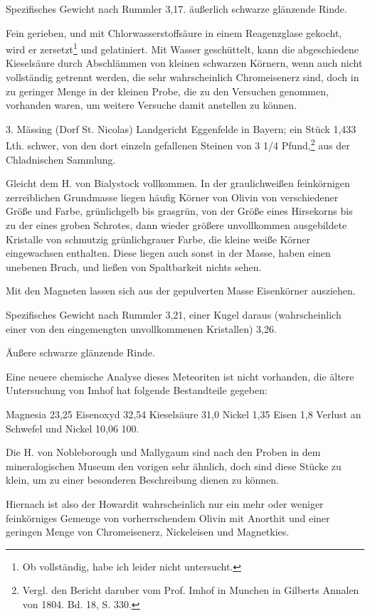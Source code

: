 \documentclass[a4paper, 11pt, oneside]{article}
\begin{document}
Spezifisches Gewicht nach Rummler 3,17. äußerlich schwarze glänzende Rinde.

Fein gerieben, und mit Chlorwasserstoffsäure in einem Reagenzglase gekocht, wird er zersetzt\footnote{Ob vollständig, habe ich leider nicht untersucht.} und gelatiniert. Mit Wasser geschüttelt, kann die abgeschiedene Kieselsäure durch Abschlämmen von kleinen schwarzen Körnern, wenn auch nicht vollständig getrennt werden, die sehr wahrscheinlich Chromeisenerz sind, doch in zu geringer Menge in der kleinen Probe, die zu den Versuchen genommen, vorhanden waren, um weitere Versuche damit anstellen zu können.

3. Mässing (Dorf St. Nicolas) Landgericht Eggenfelde in Bayern; ein Stück 1,433 Lth. schwer, von den dort einzeln gefallenen Steinen von 3 1/4 Pfund,\footnote{Vergl. den Bericht daruber vom Prof. Imhof in Munchen in Gilberts Annalen von 1804. Bd. 18, S. 330.} aus der Chladnischen Sammlung.

Gleicht dem H. von Bialystock vollkommen. In der graulichweißen feinkörnigen zerreiblichen Grundmasse liegen häufig Körner von Olivin von verschiedener Größe und Farbe, grünlichgelb bis grasgrün, von der Größe eines Hirsekorns bis zu der eines groben Schrotes, dann wieder größere unvollkommen ausgebildete Kristalle von schmutzig grünlichgrauer Farbe, die kleine weiße Körner eingewachsen enthalten. Diese liegen auch sonst in der Masse, haben einen unebenen Bruch, und ließen von Spaltbarkeit nichts sehen.

Mit den Magneten lassen sich aus der gepulverten Masse Eisenkörner ausziehen.

Spezifisches Gewicht nach Rummler 3,21, einer Kugel daraus (wahrscheinlich einer von den eingemengten unvollkommenen Kristallen) 3,26.

Äußere schwarze glänzende Rinde.

Eine neuere chemische Analyse dieses Meteoriten ist nicht vorhanden, die ältere Untersuchung von Imhof hat folgende Bestandteile gegeben:

Magnesia 23,25  
Eisenoxyd 32,54  
Kieselsäure 31,0  
Nickel 1,35  
Eisen 1,8  
Verlust an Schwefel und Nickel 10,06  
100.  

Die H. von Nobleborough und Mallygaum sind nach den Proben in dem mineralogischen Museum den vorigen sehr ähnlich, doch sind diese Stücke zu klein, um zu einer besonderen Beschreibung dienen zu können.

Hiernach ist also der Howardit wahrscheinlich nur ein mehr oder weniger feinkörniges Gemenge von vorherrschendem Olivin mit Anorthit und einer geringen Menge von Chromeisenerz, Nickeleisen und Magnetkies.
\end{document}
